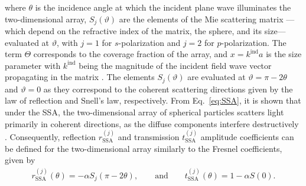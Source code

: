 where $\theta$ is the incidence angle at which the incident plane wave illuminates the two-dimensional array, $S_j(\vartheta)$ are the elements of the Mie scattering matrix \cite{bohren_absorption_1983} ---which depend on the refractive index of the matrix, the sphere, and its size--- evaluated at $\vartheta$, with $j=1$ for $s$-polarization and $j=2$ for $p$-polarization. The term $\Theta$ corresponds to the coverage fraction of the array, and $x = k^\text{ind}a$ is the size parameter with $k^\text{ind}$ being the magnitude of the incident field wave vector propagating in the matrix \cite{barrera_coherent_2003,garcia2012multiple}. The elements $S_j(\vartheta)$ are evaluated at $\vartheta = \pi-2\theta$ and $\vartheta = 0$ as they correspond to the coherent scattering directions given by the law of reflection and Snell’s law, respectively. From Eq.~\eqref{eq:SSA}, it is shown that under the SSA, the two-dimensional array of spherical particles scatters light primarily in coherent directions, as the diffuse components interfere destructively \cite{barrera_coherent_2003}. Consequently, reflection $r^{(j)}_\text{SSA}$ and transmission $t^{(j)}_\text{SSA}$ amplitude coefficients can be defined for the two-dimensional array similarly to the Fresnel coefficients, given by
%
\begin{align}
	r^{(j)}_\text{SSA}(\theta) = -\alpha   S_j(\pi-2\theta), \qquad\text{and}\qquad t^{(j)}_\text{SSA}(\theta) = 1 - \alpha S(0).
\end{align}%
%

